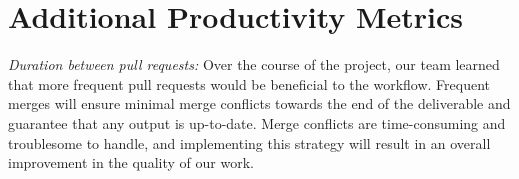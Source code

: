 \documentclass{article}
\begin{document}
\section{Additional Productivity Metrics}

\textit{Duration between pull requests:} Over the course of the project, our team learned that more frequent pull requests would be beneficial to the workflow. Frequent merges will ensure minimal merge conflicts towards the end of the deliverable and guarantee that any output is up-to-date. Merge conflicts are time-consuming and troublesome to handle, and implementing this strategy will result in an overall improvement in the quality of our work. 
\end{document}
